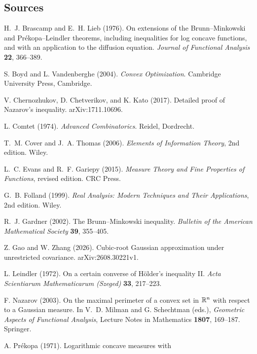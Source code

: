 \documentclass[11pt,letterpaper]{article}
\theoremstyle{plain}
\begin{document}
\subsection{Sources}\label{tb:sec:sources}

\begin{description}\footnotesize\setlength{\itemsep}{0pt}\setlength{\parskip}{0pt}
\item[{[BL76]}] H.~J. Brascamp and E.~H. Lieb (1976). On extensions of the
Brunn--Minkowski and Pr\'ekopa--Leindler theorems, including inequalities
for log concave functions, and with an application to the diffusion
equation. \emph{Journal of Functional Analysis} \textbf{22}, 366--389.
\item[{[BV04]}] S. Boyd and L. Vandenberghe (2004).
\emph{Convex Optimization}. Cambridge University Press, Cambridge.
\item[{[CCK17N]}] V. Chernozhukov, D. Chetverikov, and K. Kato (2017).
Detailed proof of Nazarov's inequality. arXiv:1711.10696.
\item[{[Com74]}] L. Comtet (1974). \emph{Advanced Combinatorics}. Reidel,
Dordrecht.
\item[{[CT06]}] T.~M. Cover and J.~A. Thomas (2006). \emph{Elements of
Information Theory}, 2nd edition. Wiley.
\item[{[EG15]}] L.~C. Evans and R.~F. Gariepy (2015). \emph{Measure Theory
and Fine Properties of Functions}, revised edition. CRC Press.
\item[{[Fol99]}] G.~B. Folland (1999). \emph{Real Analysis: Modern
Techniques and Their Applications}, 2nd edition. Wiley.
\item[{[Gar02]}] R.~J. Gardner (2002). The Brunn--Minkowski inequality.
\emph{Bulletin of the American Mathematical Society} \textbf{39}, 355--405.
\item[{[10]}] Z. Gao and W. Zhang (2026). Cubic-root Gaussian approximation
under unrestricted covariance. arXiv:2608.30221v1.
\item[{[Lei72]}] L. Leindler (1972). On a certain converse of H\"older's
inequality II. \emph{Acta Scientiarum Mathematicarum (Szeged)} \textbf{33},
217--223.
\item[{[Naz03]}] F. Nazarov (2003). On the maximal perimeter of a convex
set in \(\mathbb R^n\) with respect to a Gaussian measure. In V.~D. Milman
and G. Schechtman (eds.), \emph{Geometric Aspects of Functional Analysis},
Lecture Notes in Mathematics \textbf{1807}, 169--187. Springer.
\item[{[Pre71]}] A. Pr\'ekopa (1971). Logarithmic concave measures with

\end{description}
\end{document}
